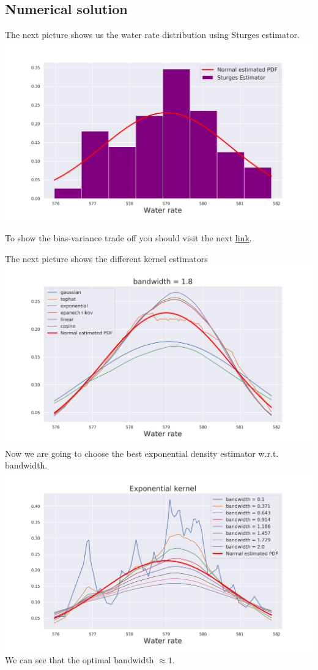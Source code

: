 \documentclass[a4paper, 12pt]{article}
\begin{document}
\subsection{Numerical solution}
The next picture shows us the water rate distribution using Sturges estimator.
\includegraphics[width=\textwidth]{Images/Task1_1.png}

To show the bias-variance trade off you should  visit the next \href{https://github.com/vitomania/ozon/blob/master/stats/hw2/Images/Task1_2.gif}{link}.

The next picture shows the different kernel estimators\\
\includegraphics[width=\textwidth]{Images/Task1_3.png}
Now we are going to choose the best exponential density estimator w.r.t. bandwidth. \\
\includegraphics[width=\textwidth]{Images/Task1_4.png}
We can see that the optimal bandwidth $\approx 1.$
\end{document}

